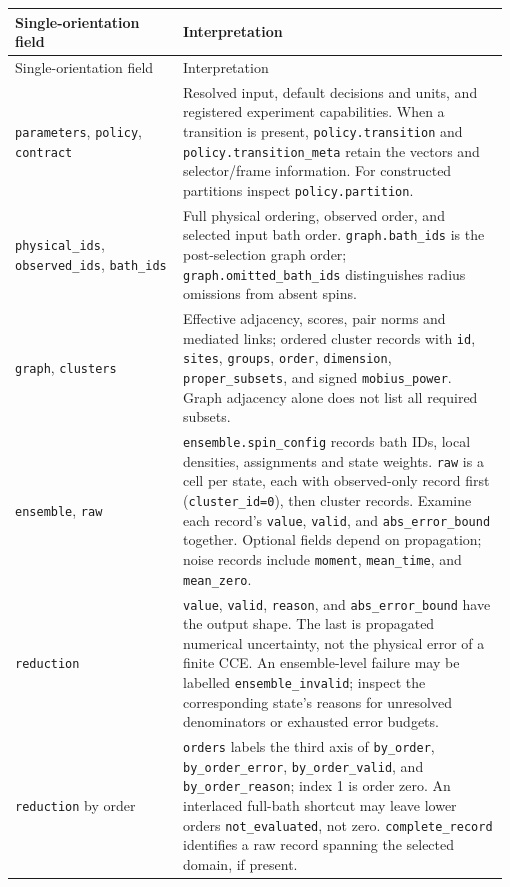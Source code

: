 \documentclass[11pt,a4paper]{article}
\newcommand{\code}[1]{\texttt{#1}}
\begin{document}
\begingroup\small
\begin{longtable}{@{}>{\raggedright\arraybackslash}p{0.335\linewidth}@{\hspace{0.025\linewidth}}>{\raggedright\arraybackslash}p{0.64\linewidth}@{}}
\toprule
Single-orientation field & Interpretation\\
\midrule\endfirsthead
\toprule
Single-orientation field & Interpretation\\
\midrule\endhead
\midrule\endfoot
\bottomrule\endlastfoot
\code{parameters}, \code{policy}, \code{contract} & Resolved input, default decisions and units, and registered experiment capabilities. When a transition is present, \code{policy.transition} and \code{policy.transition\_meta} retain the vectors and selector/frame information. For constructed partitions inspect \code{policy.partition}.\\
\code{physical\_ids}, \code{observed\_ids}, \code{bath\_ids} & Full physical ordering, observed order, and selected input bath order. \code{graph.bath\_ids} is the post-selection graph order; \code{graph.omitted\_bath\_ids} distinguishes radius omissions from absent spins.\\
\code{graph}, \code{clusters} & Effective adjacency, scores, pair norms and mediated links; ordered cluster records with \code{id}, \code{sites}, \code{groups}, \code{order}, \code{dimension}, \code{proper\_subsets}, and signed \code{mobius\_power}. Graph adjacency alone does not list all required subsets.\\
\code{ensemble}, \code{raw} & \code{ensemble.spin\_config} records bath IDs, local densities, assignments and state weights. \code{raw} is a cell per state, each with observed-only record first (\code{cluster\_id=0}), then cluster records. Examine each record's \code{value}, \code{valid}, and \code{abs\_error\_bound} together. Optional fields depend on propagation; noise records include \code{moment}, \code{mean\_time}, and \code{mean\_zero}.\\
\code{reduction} & \code{value}, \code{valid}, \code{reason}, and \code{abs\_error\_bound} have the output shape. The last is propagated numerical uncertainty, not the physical error of a finite CCE. An ensemble-level failure may be labelled \code{ensemble\_invalid}; inspect the corresponding state's reasons for unresolved denominators or exhausted error budgets.\\
\code{reduction} by order & \code{orders} labels the third axis of \code{by\_order}, \code{by\_order\_error}, \code{by\_order\_valid}, and \code{by\_order\_reason}; index 1 is order zero. An interlaced full-bath shortcut may leave lower orders \code{not\_evaluated}, not zero. \code{complete\_record} identifies a raw record spanning the selected domain, if present.\\

\end{longtable}
\end{document}
